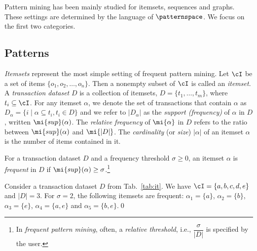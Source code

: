 Pattern mining has been mainly studied for %
itemsets, sequences and graphs. These settings are determined by the language of $\patternspace$. We focus on the first two categories. 

\subsection{Patterns} 
 \emph{Itemsets} represent the most simple setting of frequent pattern mining. Let $\cI$
be a set of items $\{o_1,o_2,\dotsc,o_n\}$. Then a nonempty subset of $\cI$ is called an \emph{itemset}. A
\emph{transaction dataset} $D$ is a collection of itemsets, $D = \{t_1 ,\dotsc, t_m \}$, where $t_i\subseteq \cI$.
For any itemset $\alpha$, we denote the set of transactions that contain $\alpha$ as $D_{\alpha}= \{i\;|\;\alpha \subseteq
t_i, t_i \in D\}$ and we refer to $|D_{\alpha}|$ as the \emph{support (frequency)} of $\alpha$ in $D$, written $\mi{sup}(\alpha)$. The \emph{relative frequency} of $\mi{\alpha}$ in $D$ refers to the ratio between $\mi{sup}(\alpha)$ and $\mi{|D|}$. %
The \emph{cardinality} (or \emph{size}) $|\alpha|$ of an itemset $\alpha$ is %
the number of items contained in it. %

\begin{definition}\label{def:frit} 
 For a transaction dataset $D$ and a frequency threshold $\sigma \geq 0$, an itemset $\alpha$ is \emph{frequent} in $D$ if  $\mi{sup}(\alpha)\geq \sigma$.\footnote{In \emph{frequent pattern mining}, often, a \emph{relative threshold}, i.e., $\dfrac{\sigma}{|D|}$ is specified by the user.}
\end{definition}



\begin{example}\label{ex:it}
Consider a transaction dataset $D$ from Tab.~\ref{tab:it}.
We have %
$\cI=\{a,b,c,d,e\}$ and $|D|=3$. For $\sigma=2$, the following itemsets are frequent: $\alpha_1{=}\{a\}$, $\alpha_2{=}\{b\}$, $\alpha_3{=}\{e\}$, $\alpha_4{=}\{a,e\}$ and $\alpha_5{=}\{b,e\}$.\qed
\end{example}

